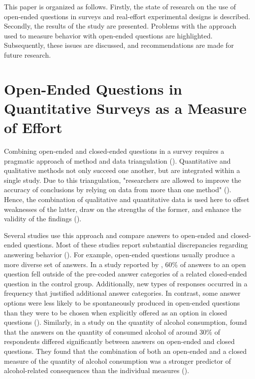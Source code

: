 \documentclass[twocolumn, serif, empirical, authordate]{jote-article}
\begin{document}
This paper is organized as follows. Firstly, the state of research on the use of open-ended questions in surveys and real-effort experimental designs is described. Secondly, the results of the study are presented.
Problems with the approach used to measure behavior with open-ended questions are highlighted. Subsequently, these issues are discussed, and recommendations are made for future research.


\section*{Open-Ended Questions in Quantitative Surveys as a Measure of Effort}
\label{sec:Open-Ended Questions in Quantitative Surveys as a Measure of Effort}

Combining open-ended and closed-ended questions in a survey requires a pragmatic approach of method and data triangulation (). Quantitative and qualitative methods not only succeed one another, but are integrated within a single study. Due to this triangulation, "researchers are allowed to improve the accuracy of conclusions by relying on data from more than one method" (). Hence, the combination of qualitative and quantitative data is used here to offset weaknesses of the latter, draw on the strengths of the former, and enhance the validity of the findings ().

Several studies use this approach and compare answers to open-ended and closed-ended questions. Most of these studies report substantial discrepancies regarding answering behavior (). For example, open-ended questions usually produce a more diverse set of answers. In a study reported by \textcite{Schuman1979}, 60\% of answers to an open question fell outside of the pre-coded answer categories of a related closed-ended question in the control group. Additionally, new types of responses occurred in a frequency that justified additional answer categories. In contrast, some answer options were less likely to be spontaneously produced in open-ended questions than they were to be chosen when explicitly offered as an option in closed questions (). Similarly, in a study on the quantity of alcohol consumption, \textcite{Greenfield2006} found that the answers on the quantity of consumed alcohol of around 30\% of respondents differed significantly between answers on open-ended and closed questions. They found that the combination of both an open-ended and a closed measure of the quantity of alcohol consumption was a stronger predictor of alcohol-related consequences than the individual measures ().
\end{document}

